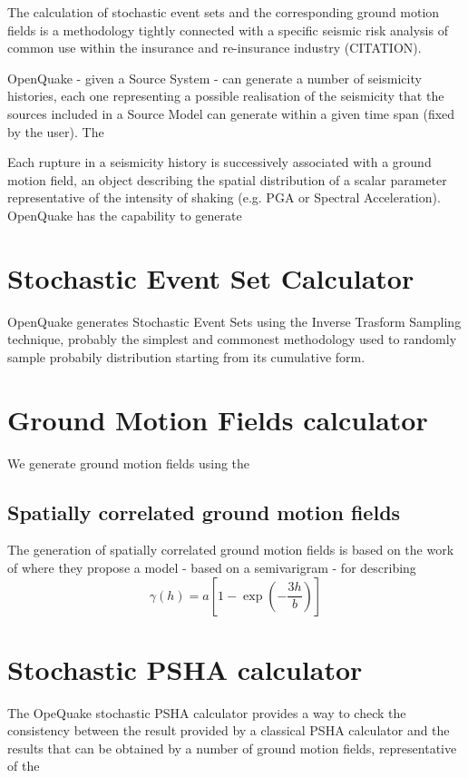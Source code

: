 The calculation of stochastic event sets  and the corresponding ground motion fields is a methodology tightly connected with a specific seismic risk analysis of common use within the insurance and re-insurance industry (CITATION). 

OpenQuake - given a Source System - can generate a number of seismicity histories, each one representing a possible realisation of the seismicity that the sources included in a Source Model can generate within a given time span (fixed by the user).
% 
The 

Each rupture in a seismicity history is successively associated with a ground motion field, an object describing the spatial distribution of a scalar parameter representative of the intensity of shaking (e.g. PGA or Spectral Acceleration). OpenQuake has the capability to generate 
%
\section{Stochastic Event Set Calculator}
OpenQuake generates Stochastic Event Sets using the Inverse Trasform Sampling technique, probably the simplest and commonest methodology used to randomly sample probabily distribution starting from its cumulative form. 

%
\section{Ground Motion Fields calculator} 
We generate ground motion fields using the

%
\subsection{Spatially correlated ground motion fields}
The generation of spatially correlated ground motion fields is based on the work of \citet{jayaram2009} where they propose a model - based on a semivarigram - for describing 
\begin{equation}
\gamma(h) = a \left[1-\exp\left(-\frac{3h}{b}\right)\right]
\end{equation}

%
\section{Stochastic PSHA calculator} 
The OpeQuake stochastic PSHA calculator provides a way to check the consistency between the result provided by a classical PSHA calculator and the results that can be obtained by a number of ground motion fields, representative of the 
